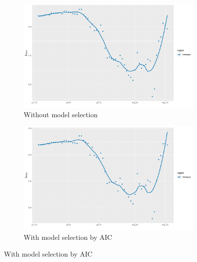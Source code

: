 \documentclass[12pt]{article}
\begin{document}
\begin{appendices}
		\begin{figure}[H]
    	    \centering
    	    \begin{subfigure}{\textwidth}
    	      \centering
    	      \includegraphics[width=0.95\linewidth]{output/model_within_lag14_betawithin_Isole_rolling.pdf}
    	      \caption{Without model selection}
    	      \label{fig:beta_within_over_time_isole_regular}
    	    \end{subfigure}\newline
    	    \begin{subfigure}{\textwidth}
    	      \centering
    	      \includegraphics[width=0.95\linewidth]{output/model_within_lag14_betawithin_Isole_aic_rolling.pdf}
    	      \caption{With model selection by AIC}
    	      \label{fig:beta_within_over_time_isole_aic}
    	    \end{subfigure}
    	\end{figure}
        \begin{figure}[H]\ContinuedFloat
    	    \begin{subfigure}{\textwidth}
    	      \centering

\end{subfigure}
\end{figure}
\end{appendices}
\end{document}
